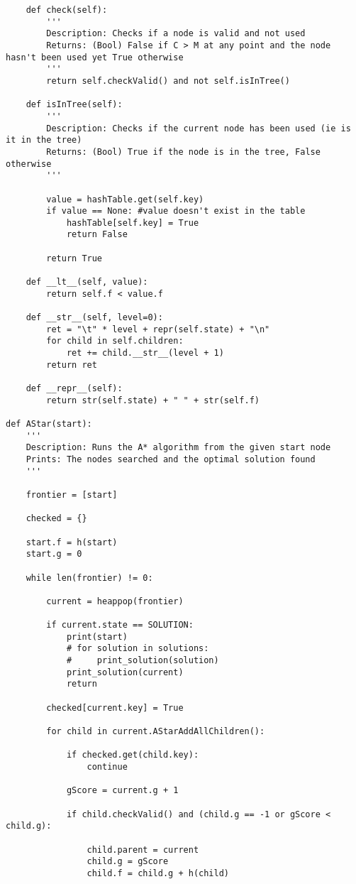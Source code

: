 \documentclass{article}
\begin{document}
\begin{verbatim}
    def check(self):
        '''
        Description: Checks if a node is valid and not used
        Returns: (Bool) False if C > M at any point and the node hasn't been used yet True otherwise
        '''
        return self.checkValid() and not self.isInTree()

    def isInTree(self):
        '''
        Description: Checks if the current node has been used (ie is it in the tree)
        Returns: (Bool) True if the node is in the tree, False otherwise
        '''

        value = hashTable.get(self.key)
        if value == None: #value doesn't exist in the table
            hashTable[self.key] = True
            return False

        return True

    def __lt__(self, value):
        return self.f < value.f

    def __str__(self, level=0):
        ret = "\t" * level + repr(self.state) + "\n"
        for child in self.children:
            ret += child.__str__(level + 1)
        return ret

    def __repr__(self):
        return str(self.state) + " " + str(self.f)

def AStar(start):
    '''
    Description: Runs the A* algorithm from the given start node
    Prints: The nodes searched and the optimal solution found
    '''

    frontier = [start]

    checked = {}

    start.f = h(start)
    start.g = 0

    while len(frontier) != 0:

        current = heappop(frontier)

        if current.state == SOLUTION:
            print(start)
            # for solution in solutions:
            #     print_solution(solution)
            print_solution(current)
            return

        checked[current.key] = True

        for child in current.AStarAddAllChildren():

            if checked.get(child.key):
                continue

            gScore = current.g + 1

            if child.checkValid() and (child.g == -1 or gScore < child.g):

                child.parent = current
                child.g = gScore
                child.f = child.g + h(child)


\end{verbatim}
\end{document}
